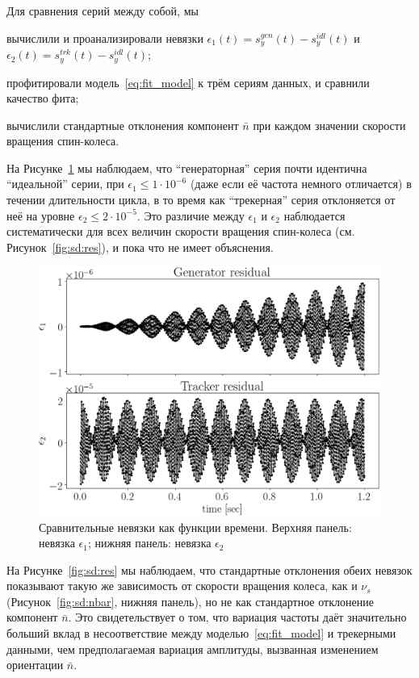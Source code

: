Для сравнения серий между собой, мы
\begin{enumerate*}
\item вычислили и проанализировали невязки $\epsilon_1(t) = s_y^{gen}(t) -
  s_y^{idl}(t)$ и $\epsilon_2(t) = s_y^{trk}(t) - s_y^{idl}(t)$;
\item профитировали модель~\eqref{eq:fit_model} к трём сериям данных, и
  сравнили качество фита;
\item вычислили стандартные отклонения компонент $\bar n$ при каждом
  значении скорости вращения спин-колеса.
\end{enumerate*}

На Рисунке~\ref{fig:residuals} мы наблюдаем, что ``генераторная'' серия почти идентична
``идеальной'' серии, при ${\epsilon_1 \le 1\cdot10^{-6}}$ 
(даже если её частота немного отличается) в течении длительности цикла,
в то время как ``трекерная'' серия отклоняется от неё на уровне
${\epsilon_2 \le 2\cdot 10^{-5}}$.  Это различие между $\epsilon_1$ и $\epsilon_2$ наблюдается
систематически для всех величин скорости вращения спин-колеса (см. Рисунок~\ref{fig:sd:res}), 
и пока что не имеет объяснения.

\begin{figure}[h]
	\centering
	\includegraphics[height=.33\paperheight]{images/smp_sim/residual_vs_time(both)}
	\caption{Сравнительные невязки как функции времени.
		Верхняя панель: невязка $\epsilon_1$; нижняя панель: невязка $\epsilon_2$\label{fig:residuals}}
\end{figure}

На Рисунке~\ref{fig:sd:res} мы наблюдаем, что стандартные отклонения обеих невязок показывают 
такую же зависимость от скорости вращения колеса, как и $\nu_s$ (Рисунок~\ref{fig:sd:nbar}, нижняя панель),
 но не как стандартное отклонение компонент $\bar n$.
Это свидетельствует о том, что вариация частоты даёт значительно больший вклад в несоответствие между
моделью~\eqref{eq:fit_model} и трекерными данными, чем предполагаемая вариация амплитуды, вызванная изменением ориентации $\bar n$.

